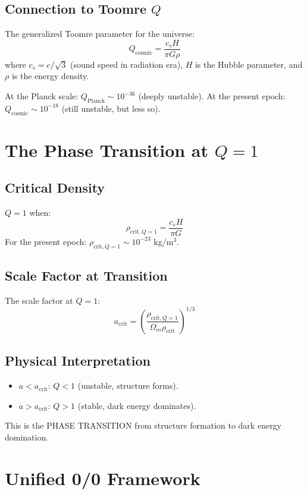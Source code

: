 \documentclass[11pt]{article}
\begin{document}
\subsection{Connection to Toomre $Q$}

The generalized Toomre parameter for the universe:
\[
  Q_{\text{cosmic}} = \frac{c_s H}{\pi G \rho}
\]
where $c_s = c/\sqrt{3}$ (sound speed in radiation era), $H$ is the
Hubble parameter, and $\rho$ is the energy density.

At the Planck scale: $Q_{\text{Planck}} \sim 10^{-36}$ (deeply unstable).
At the present epoch: $Q_{\text{cosmic}} \sim 10^{-18}$ (still unstable,
but less so).

\section{The Phase Transition at $Q = 1$}

\subsection{Critical Density}

$Q = 1$ when:
\[
  \rho_{\text{crit},Q=1} = \frac{c_s H}{\pi G}
\]
For the present epoch: $\rho_{\text{crit},Q=1} \sim 10^{-23}$ kg/m$^3$.

\subsection{Scale Factor at Transition}

The scale factor at $Q = 1$:
\[
  a_{\text{crit}} = \left(\frac{\rho_{\text{crit},Q=1}}{\Omega_m \rho_{\text{crit}}}\right)^{1/3}
\]

\subsection{Physical Interpretation}

\begin{itemize}
\item $a < a_{\text{crit}}$: $Q < 1$ (unstable, structure forms).
\item $a > a_{\text{crit}}$: $Q > 1$ (stable, dark energy dominates).
\end{itemize}

This is the PHASE TRANSITION from structure formation to dark energy
domination.

\section{Unified 0/0 Framework}
\end{document}
